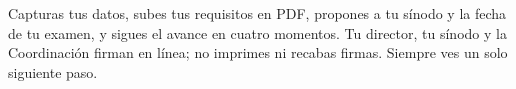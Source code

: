 \documentclass[11pt,a4paper]{article}
\begin{document}
{\small\tableofcontents}
\newpage
\begin{quevasahacer}
Capturas tus datos, subes tus requisitos en PDF, propones a tu sínodo y la fecha de tu examen, y sigues el avance en cuatro momentos. Tu director, tu sínodo y la Coordinación firman en línea; no imprimes ni recabas firmas. Siempre ves un solo siguiente paso.
\end{quevasahacer}




\end{document}
